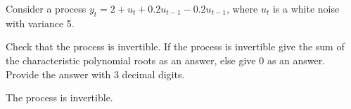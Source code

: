 
\begin{question}
Consider a process \(y_t = 2 + u_t + 0.2 u_{t-1} - 0.2 u_{t-1}\), where \(u_t\) is a white noise with variance 5.

Check that the process is invertible. If the process is invertible give the sum of the characteristic polynomial roots as an answer, else give 0 as an answer.
Provide the answer with 3 decimal digits.
\end{question}

\begin{solution}
The process is invertible.
\end{solution}

